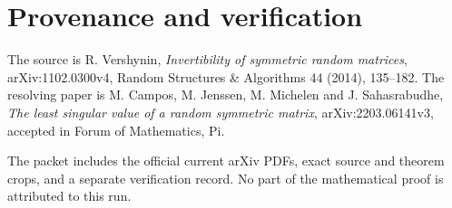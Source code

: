 \documentclass[11pt]{article}
\begin{document}
\section{Provenance and verification}

The source is R. Vershynin, \emph{Invertibility of symmetric random matrices},
arXiv:1102.0300v4, Random Structures \& Algorithms 44 (2014), 135--182.
The resolving paper is M. Campos, M. Jenssen, M. Michelen and
J. Sahasrabudhe, \emph{The least singular value of a random symmetric matrix},
arXiv:2203.06141v3, accepted in Forum of Mathematics, Pi.

The packet includes the official current arXiv PDFs, exact source and theorem
crops, and a separate verification record.  No part of the mathematical proof
is attributed to this run.
\end{document}
